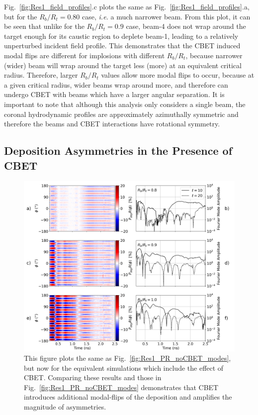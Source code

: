 Fig.~\ref{fig:Res1_field_profiles}.c plots the same as Fig.~\ref{fig:Res1_field_profiles}.a, but for the $R_b/R_t=0.80$ case, \textit{i.e.} a much narrower beam.
From this plot, it can be seen that unlike for the $R_b/R_t=0.9$ case, beam-4 does not wrap around the target enough for its caustic region to deplete beam-1, leading to a relatively unperturbed incident field profile.
This demonstrates that the \ac{CBET} induced modal flips are different for implosions with different $R_b/R_t$, because narrower (wider) beam will wrap around the target less (more) at an equivalent critical radius.
Therefore, larger $R_b/R_t$ values allow more modal flips to occur, because at a given critical radius, wider beams wrap around more, and therefore can undergo \ac{CBET} with beams which have a larger angular separation.
It is important to note that although this analysis only considers a single beam, the coronal hydrodynamic profiles are approximately azimuthally symmetric and therefore the beams and \ac{CBET} interactions have rotational symmetry.

\subsection{Deposition Asymmetries in the Presence of CBET}%
\label{sec:Res1_CBET_asymmetries}

\begin{figure}[t!]
    \includegraphics[width=\linewidth]{Results1/Images/CBET_PR_modes.png}
    \centering
    \caption{This figure plots the same as Fig.~\ref{fig:Res1_PR_noCBET_modes}, but now for the equivalent simulations which include the effect of \ac{CBET}.
    Comparing these results and those in Fig.~\ref{fig:Res1_PR_noCBET_modes} demonstrates that \ac{CBET} introduces additional modal-flips of the deposition and amplifies the magnitude of asymmetries.}%
    \label{fig:Res1_PR_CBET_modes}
\end{figure}

